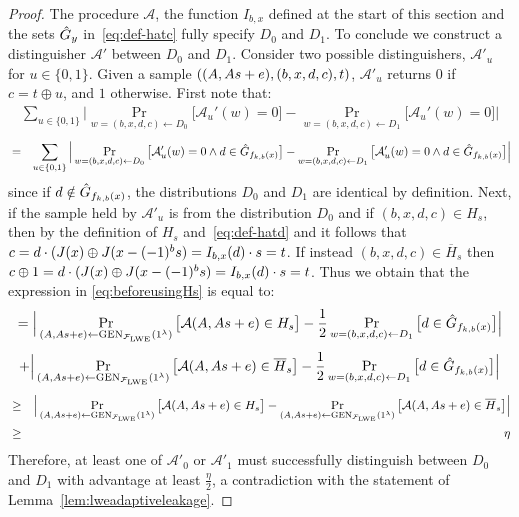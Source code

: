 \begin{proof}
The procedure $\mathcal{A}$, the function $I_{b,x}$ defined at the start of this section and the sets $\hat{G}_{y}$ in~\eqref{eq:def-hatc} fully specify ${D}_0$ and ${D}_1$. To conclude we construct a distinguisher $\mathcal{A}'$ between ${D}_0$ and ${D}_1$. Consider two possible distinguishers, $\mathcal{A}'_u$ for $u\in \{0,1\}$. Given a sample $((\*A,\*A\*s+\*e),(b,x,d,c),t)$, $\mathcal{A}'_u$ returns $0$ if $c=t\oplus u$, and $1$ otherwise. First note that:
\begin{eqnarray}
\sum_{u\in \{0,1\}} \Big|\Pr_{w=(b,x,d,c)\leftarrow {D}_0}\big[\mathcal{A}_u'(w)=0\big]-\Pr_{w=(b,x,d,c)\leftarrow {D}_1}\big[\mathcal{A}_u'(w)=0\big]\Big|
\end{eqnarray}
\begin{eqnarray}
&=& \sum_{u\in\{0,1\}}\Big|\Pr_{w=(b,x,d,c)\leftarrow {D}_0}\big[\mathcal{A}_u'(w)=0 \wedge d\in \hat{G}_{f_{k,b}(x)} \big]-\Pr_{w=(b,x,d,c)\leftarrow {D}_1}\big[\mathcal{A}_u'(w)=0 \wedge d\in \hat{G}_{f_{k,b}(x)}\big]\Big|\label{eq:beforeusingHs}
\end{eqnarray}
since if $d\notin \hat{G}_{f_{k,b}(x)}$, the distributions ${D}_0$ and ${D}_1$ are identical by definition. Next, if the sample held by $\mathcal{A}'_u$ is from the distribution ${D}_0$ and if $(b,x,d,c) \in H_s$, then by the definition of $H_s$ and~\eqref{eq:def-hatd} and it follows that $c = d\cdot(\inj(x)\oplus \inj( x - (-1)^b \*s )  = I_{b,x}(d)\cdot s = t$. If instead $(b,x,d,c)\in \overline{H}_s$ then $c\oplus 1 = d\cdot(\inj(x)\oplus \inj( x - (-1)^b \*s ) = I_{b,x}(d)\cdot s = t$.
Thus we obtain that the expression in \eqref{eq:beforeusingHs} is equal to: 
\begin{equation}
= \Big|\Pr_{(\*A,\*A\*s+\*e)\leftarrow \textrm{GEN}_{\mathcal{F}_{\lwe}}(1^{\lambda})}\big[\mathcal{A}(\*A,\*A\*s+\*e) \in H_s\big] -\frac{1}{2}\Pr_{w=(b,x,d,c)\leftarrow {D}_1}\big[ d\in \hat{\dset}_{f_{k,b}(x)}\big]\Big| 
\end{equation}
\begin{equation}
+ \Big|\Pr_{(\*A,\*A\*s+\*e)\leftarrow \textrm{GEN}_{\mathcal{F}_{\lwe}}(1^{\lambda})}\big[\mathcal{A}(\*A,\*A\*s+\*e) \in \overline{H}_s\big]-\frac{1}{2}\Pr_{w=(b,x,d,c)\leftarrow {D}_1}\big[ d\in \hat{\dset}_{f_{k,b}(x)}\big]\Big|\\
\end{equation}
\begin{eqnarray}
&\geq& \Big|\Pr_{(\*A,\*A\*s+\*e)\leftarrow \textrm{GEN}_{\mathcal{F}_{\lwe}}(1^{\lambda})}\big[\mathcal{A}(\*A,\*A\*s+\*e) \in H_s\big] - \Pr_{(\*A,\*A\*s+\*e)\leftarrow \textrm{GEN}_{\mathcal{F}_{\lwe}}(1^{\lambda})}\big[\mathcal{A}(\*A,\*A\*s+\*e) \in \overline{H}_s\big]\Big| \\
&\geq& \eta
\end{eqnarray} 
Therefore, at least one of $\mathcal{A}'_0$ or $\mathcal{A}'_1$ must successfully distinguish between ${D}_0$ and ${D}_1$ with advantage at least $\frac{\eta}{2}$, a contradiction with the statement of Lemma~\ref{lem:lweadaptiveleakage}. 
\end{proof}